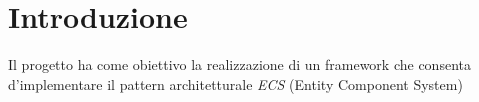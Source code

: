 \chapter*{Introduzione}
Il progetto ha come obiettivo la realizzazione di un framework che consenta d'implementare il pattern architetturale
\textit{ECS} (Entity Component System)
